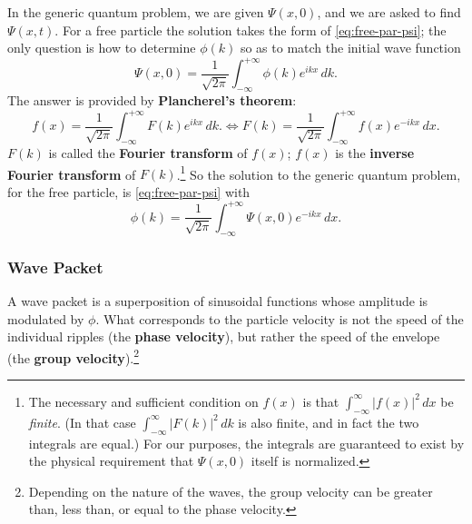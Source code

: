 \documentclass{article}
\begin{document}
In the generic quantum problem, we are given $\Psi(x, 0)$, and we are asked to
find $\Psi(x, t)$. For a free particle the solution takes the form of
\eqref{eq:free-par-psi}; the only question is how to determine $\phi(k)$ so as
to match the initial wave function \[
  \Psi(x, 0)
  = \frac{1}{\sqrt{2\pi}}\int_{-\infty}^{+\infty} \phi(k)e^{ikx} \,dk.
\] The answer is provided by \textbf{Plancherel's theorem}:
\begin{equation} \label{eq:plan-thm}
  f(x) = \frac{1}{\sqrt{2\pi}}\int_{-\infty}^{+\infty} F(k)e^{ikx} \,dk.
  \iff
  F(k) = \frac{1}{\sqrt{2\pi}}\int_{-\infty}^{+\infty} f(x)e^{-ikx} \,dx.
\end{equation}
$F(k)$ is called the \textbf{Fourier transform} of $f(x)$; $f(x)$ is the
\textbf{inverse Fourier transform} of $F(k)$.\footnote{The necessary and
sufficient condition on $f(x)$ is that $\int_{-\infty}^{\infty} |f(x)|^2 \,dx$
be \emph{finite}. (In that case $\int_{-\infty}^{\infty} |F(k)|^2 \,dk$ is also
finite, and in fact the two integrals are equal.) For our purposes, the
integrals are guaranteed to exist by the physical requirement that $\Psi(x, 0)$
itself is normalized.} So the solution to the generic quantum problem, for the free
particle, is \eqref{eq:free-par-psi} with
\begin{equation} \label{eq:free-par-phi}
  \boxed{
    \phi(k)
    = \frac{1}{\sqrt{2\pi}}\int_{-\infty}^{+\infty}
      \Psi(x, 0)e^{-ikx}
    \,dx.
  }
\end{equation}

\subsubsection{Wave Packet}

A wave packet is a superposition of sinusoidal functions whose amplitude is
modulated by $\phi$. What corresponds to the particle velocity is not the
speed of the individual ripples (the \textbf{phase velocity}), but rather the
speed of the envelope (the \textbf{group velocity}).\footnote{Depending on the
nature of the waves, the group velocity can be greater than, less than, or
equal to the phase velocity.}
\end{document}
